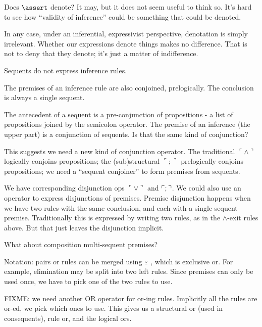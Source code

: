 \documentclass{article}
\begin{document}
Does \(\linfer\) denote? It may, but it does not seem useful to think
so. It's hard to see how ``validity of inference'' could be something
that could be denoted.

In any case, under an inferential, expressivist perspective,
denotation is simply irrelevant. Whether our expressions denote things
makes no difference. That is not to deny that they denote; it's just a
matter of indifference.

Sequents do not express inference rules.

The premises of an inference rule are also conjoined, prelogically.
The conclusion is always a single sequent.

The antecedent of a sequent is a pre-conjunction of propositions - a
list of propositions joined by the semicolon operator. The premise of
an inference (the upper part) is a conjunction of sequents. Is that
the same kind of conjunction?

This suggests we need a new kind of conjunction operator. The
traditional \(\ulcorner\land\urcorner\) logically conjoins propositions; the
(sub)structural \(\ulcorner ;\urcorner\) prelogically conjoins propositions; we need a
``sequent conjoiner'' to form premises from sequents.

We have corresponding disjunction ops \(\ulcorner\lor\urcorner\) and
\(\ulcorner\structor\urcorner\). We could also use an operator to
express disjunctions of premises. Premise disjunction happens when we
have two rules with the same conclusion, and each with a single
sequent premise. Traditionally this is expressed by writing two rules, as in the \(\land\text{-exit}\) rules above.
But that just leaves the disjunction implicit.

What about composition multi-sequent premises?

Notation: pairs or rules can be merged using \(\scriptscriptstyle\veebar\ \), which is
exclusive or. For example, elimination may be split into two left
rules. Since premises can only be used once, we have to pick one of
the two rules to use.

FIXME: we need another OR operator for or-ing rules. Implicitly all
the rules are or-ed, we pick which ones to use. This gives us a
structural or (used in consequents), rule or, and the logical ors.


\end{document}
